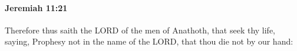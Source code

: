 
		\paragraph{Jeremiah 11:21} %
			\label{JEREMIAH-11-21}

			Therefore thus saith the LORD of the men of Anathoth, that seek thy life, saying, Prophesy not in the name of the LORD, that thou die not by our hand:


